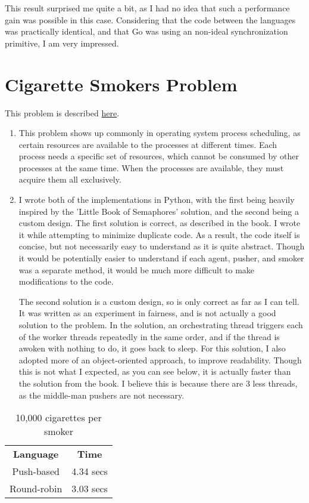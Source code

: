 \documentclass[a4paper,10pt]{article}
\begin{document}
This result surprised me quite a bit, as I had no idea that such a performance gain was possible in this case. Considering that the code between the languages was practically identical, and that Go was using an non-ideal synchronization primitive, I am very impressed.

\newpage
\section{Cigarette Smokers Problem}
This problem is described \href{http://greenteapress.com/semaphores/LittleBookOfSemaphores.pdf#section.4.5}{here}.

\begin{enumerate}
    \item This problem shows up commonly in operating system process scheduling, as certain resources are available to the processes at different times. Each process needs a specific set of resources, which cannot be consumed by other processes at the same time. When the processes are available, they must acquire them all exclusively.
    \item I wrote both of the implementations in Python, with the first being heavily inspired by the 'Little Book of Semaphores' solution, and the second being a custom design. The first solution is correct, as described in the book. I wrote it while attempting to minimize duplicate code. As a result, the code itself is concise, but not necessarily easy to understand as it is quite abstract. Though it would be potentially easier to understand if each agent, pusher, and smoker was a separate method, it would be much more difficult to make modifications to the code.
    
    The second solution is a custom design, so is only correct as far as I can tell. It was written as an experiment in fairness, and is not actually a good solution to the problem. In the solution, an orchestrating thread triggers each of the worker threads repeatedly in the same order, and if the thread is awoken with nothing to do, it goes back to sleep. For this solution, I also adopted more of an object-oriented approach, to improve readability. Though this is not what I expected, as you can see below, it is actually faster than the solution from the book. I believe this is because there are 3 less threads, as the middle-man pushers are not necessary.
\end{enumerate}

\begin{table}[h]
    \centering
    \begin{tabular}{cc}
        \textbf{Language} & \textbf{Time}\\
        Push-based & 4.34 secs\\
        Round-robin & 3.03 secs
    \end{tabular}
    \caption{10,000 cigarettes per smoker}
\end{table}
\end{document}
